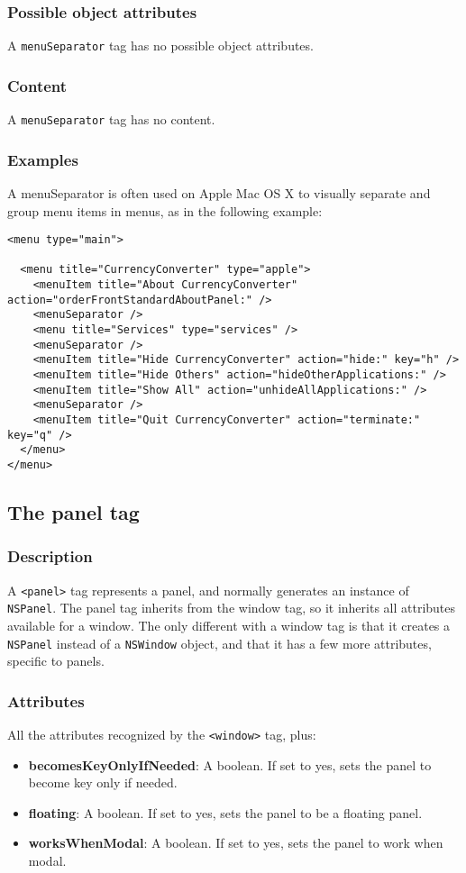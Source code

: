 \subsubsection{Possible object attributes}
A \texttt{menuSeparator} tag has no possible object attributes.

\subsubsection{Content}
A \texttt{menuSeparator} tag has no content.

\subsubsection{Examples}
A menuSeparator is often used on Apple Mac OS X to visually separate and
group menu items in menus, as in the following example:
\begin{verbatim}
<menu type="main">

  <menu title="CurrencyConverter" type="apple">
    <menuItem title="About CurrencyConverter" action="orderFrontStandardAboutPanel:" />
    <menuSeparator />
    <menu title="Services" type="services" />
    <menuSeparator />
    <menuItem title="Hide CurrencyConverter" action="hide:" key="h" />
    <menuItem title="Hide Others" action="hideOtherApplications:" />
    <menuItem title="Show All" action="unhideAllApplications:" />
    <menuSeparator />
    <menuItem title="Quit CurrencyConverter" action="terminate:" key="q" />
  </menu>
</menu>
\end{verbatim}

\subsection{The panel tag}

\subsubsection{Description}
A \texttt{<panel>} tag represents a panel, and normally generates an
instance of \texttt{NSPanel}.  The panel tag inherits from the window
tag, so it inherits all attributes available for a window.  The only
different with a window tag is that it creates a \texttt{NSPanel}
instead of a \texttt{NSWindow} object, and that it has a few more
attributes, specific to panels.

\subsubsection{Attributes}
All the attributes recognized by the \texttt{<window>} tag, plus:
\begin{itemize}
\item {\bf becomesKeyOnlyIfNeeded}: A boolean.  If set to yes, sets
  the panel to become key only if needed.
\item {\bf floating}: A boolean.  If set to yes, sets the panel to be
  a floating panel.
\item {\bf worksWhenModal}: A boolean.  If set to yes, sets the panel
  to work when modal.
\end{itemize}

